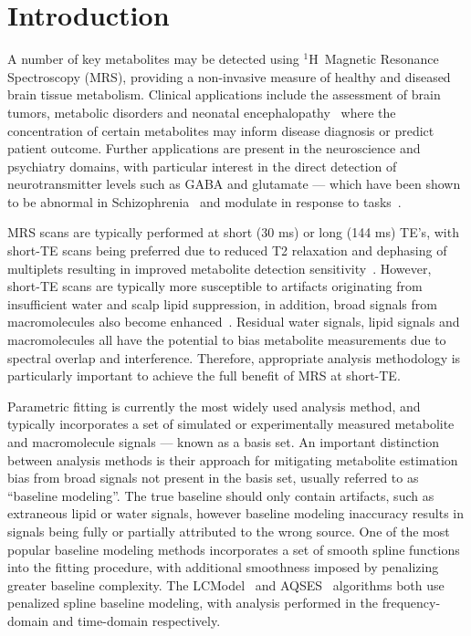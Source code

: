 \documentclass[num-refs]{wiley-article}
\newcommand{\proton}{\ensuremath{^1\mathrm{H}}}
\begin{document}
\section{Introduction}
A number of key metabolites may be detected using \proton\ Magnetic Resonance Spectroscopy (MRS), providing a non-invasive measure of healthy and diseased brain tissue metabolism. Clinical applications include the assessment of brain tumors, metabolic disorders and neonatal encephalopathy~\cite{Oz2014,Lally2019} where the concentration of certain metabolites may inform disease diagnosis or predict patient outcome. Further applications are present in the neuroscience and psychiatry domains, with particular interest in the direct detection of neurotransmitter levels such as GABA and glutamate --- which have been shown to be abnormal in Schizophrenia~\cite{Merritt2016} and modulate in response to tasks~\cite{Jelen2018,Chen2017}.

MRS scans are typically performed at short (30 ms) or long (144 ms) TE's, with short-TE scans being preferred due to reduced T2 relaxation and dephasing of multiplets resulting in improved metabolite detection sensitivity~\cite{Wilson2019}. However, short-TE scans are typically more susceptible to artifacts originating from insufficient water and scalp lipid suppression, in addition, broad signals from macromolecules also become enhanced~\cite{Cudalbu2012}. Residual water signals, lipid signals and macromolecules all have the potential to bias metabolite measurements due to spectral overlap and interference. Therefore, appropriate analysis methodology is particularly important to achieve the full benefit of MRS at short-TE.

Parametric fitting is currently the most widely used analysis method, and typically incorporates a set of simulated or experimentally measured metabolite and macromolecule signals --- known as a basis set. An important distinction between analysis methods is their approach for mitigating metabolite estimation bias from broad signals not present in the basis set, usually referred to as ``baseline modeling''. The true baseline should only contain artifacts, such as extraneous lipid or water signals, however baseline modeling inaccuracy results in signals being fully or partially attributed to the wrong source. One of the most popular baseline modeling methods incorporates a set of smooth spline functions into the fitting procedure, with additional smoothness imposed by penalizing greater baseline complexity. The LCModel~\cite{Provencher1993} and AQSES~\cite{Poullet2007} algorithms both use penalized spline baseline modeling, with analysis performed in the frequency-domain and time-domain respectively.
\end{document}

